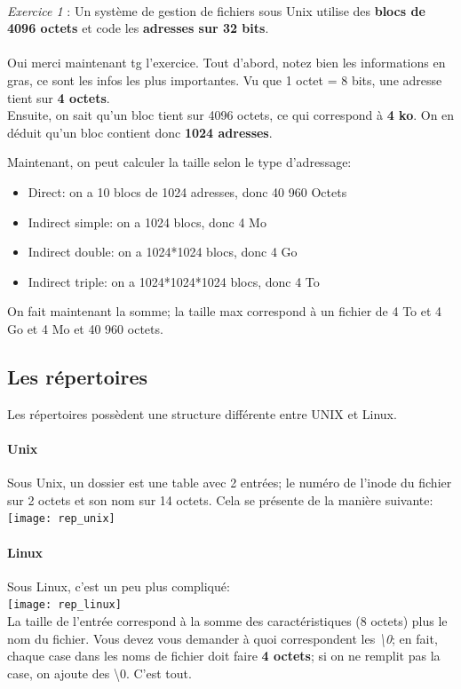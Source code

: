\documentclass{report}
\begin{document}
\paragraph{}
\emph{Exercice 1} : Un système de gestion de fichiers sous Unix utilise des \textbf{blocs de 4096 octets} et code les \textbf{adresses sur 32 bits}.
\\
\\
Oui merci maintenant tg l'exercice. Tout d'abord, notez bien les informations en gras, ce sont les infos les plus importantes. Vu que 1 octet = 8 bits, une adresse tient sur \textbf{4 octets}. \\
Ensuite, on sait qu'un bloc tient sur 4096 octets, ce qui correspond à \textbf{4 ko}. On en déduit qu'un bloc contient donc \textbf{1024 adresses}.

Maintenant, on peut calculer la taille selon le type d'adressage:
\begin{itemize}
\item{Direct: on a 10 blocs de 1024 adresses, donc 40 960 Octets}
\item{Indirect simple: on a 1024 blocs, donc 4 Mo}
\item{Indirect double: on a 1024*1024 blocs, donc 4 Go}
\item{Indirect triple: on a 1024*1024*1024 blocs, donc 4 To}
\end{itemize}
On fait maintenant la somme; la taille max correspond à un fichier de 4 To et 4 Go et 4 Mo et 40 960 octets.

\subsection{Les répertoires}
Les répertoires possèdent une structure différente entre UNIX et Linux.
\paragraph{Unix}
Sous Unix, un dossier est une table avec 2 entrées; le numéro de l'inode du fichier sur 2 octets et son nom sur 14 octets. Cela se présente de la manière suivante:\\
\texttt{[image: rep\_unix]}
\\
\paragraph{Linux}
Sous Linux, c'est un peu plus compliqué:\\
\texttt{[image: rep\_linux]}
\\
La taille de l'entrée correspond à la somme des caractéristiques (8 octets) plus le nom du fichier. Vous devez vous demander à quoi correspondent les \emph{\textbackslash 0}; en fait, chaque case dans les noms de fichier doit faire \textbf{4 octets}; si on ne remplit pas la case, on ajoute des \textbackslash0. C'est tout.
\end{document}
